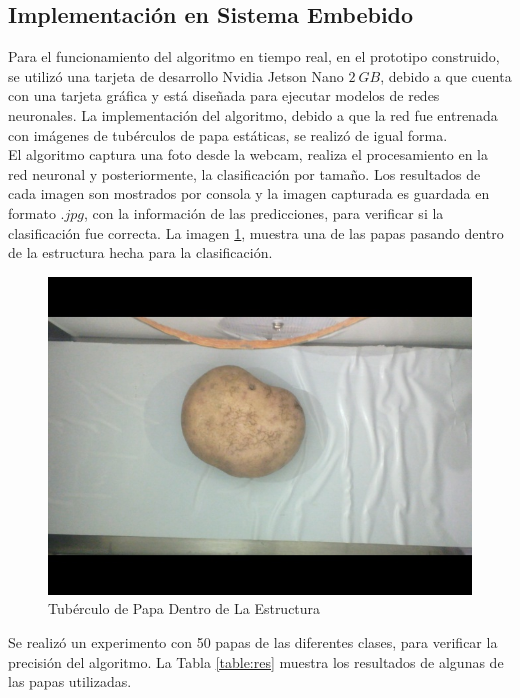 \subsection{Implementación en Sistema Embebido}

Para el funcionamiento del algoritmo en tiempo real, en el prototipo construido, se utilizó una tarjeta de desarrollo Nvidia Jetson Nano $2 \ GB$, debido a que cuenta con una tarjeta gráfica y está diseñada para ejecutar modelos de redes neuronales. La implementación del algoritmo, debido a que la red fue entrenada con imágenes de tubérculos de papa estáticas, se realizó de igual forma.\\

El algoritmo captura una foto desde la webcam, realiza el procesamiento en la red neuronal y posteriormente, la clasificación por tamaño. Los resultados de cada imagen son mostrados por consola y la imagen capturada es guardada en formato $.jpg$, con la información de las predicciones, para verificar si la clasificación fue correcta. La imagen \ref{fig:implementacion}, muestra una de las papas pasando dentro de la estructura hecha para la clasificación.

\begin{figure}[ht]
	\centering
	\includegraphics[scale=0.25]{Figs/implementacion.jpg}
	\caption{Tubérculo de Papa Dentro de La Estructura}
	\label{fig:implementacion}
\end{figure}

\newpage
Se realizó un experimento con 50 papas de las diferentes clases, para verificar la precisión del algoritmo. La Tabla \ref{table:res} muestra los resultados de algunas de las papas utilizadas.

